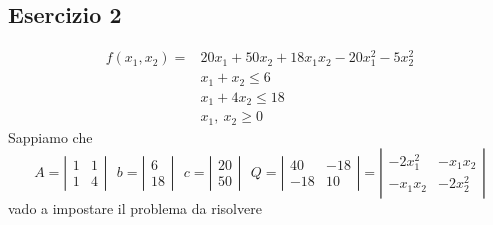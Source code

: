 \documentclass[12pt,a4paper]{article}
\begin{document}
\subsection{Esercizio 2}
\begin{equation*}
\begin{array}{rl}
f(x_1,x_2) = & 20x_1+50x_2+18x_1x_2 -20x_1^2-5x_2^2\\
& x_1+x_2 \leq 6\\
& x_1+4x_2 \leq 18\\
& x_1,\ x_2 \geq 0
\end{array}
\end{equation*}
Sappiamo che $$A=\left|\begin{array}{cc} 1 & 1\\ 1& 4\end{array}\right| \ \ \ b=\left|\begin{array}{c} 6\\18\end{array}\right| \ \ \ c=\left|\begin{array}{c} 20\\50\end{array}\right| \ \ \ Q=\left|\begin{array}{cc} 40 & -18\\ -18 & 10\end{array}\right| = \left|\begin{array}{cc} -2x_1^2 & -x_1x_2\\ -x_1x_2 & -2x_2^2\end{array}\right|$$
vado a impostare il problema da risolvere
\end{document}
